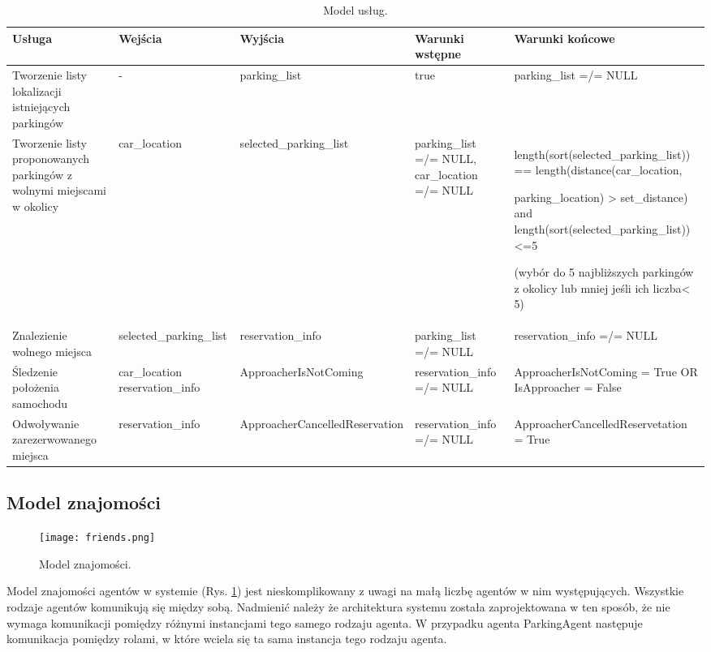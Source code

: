 \begin{table}[!h] \label{tab:modeluslug} \centering
    \caption{Model usług.}
    \begin{tabular} {| m{2cm} | m{2cm} | m{3cm} | m{3cm} | m{4cm} |} \hline
        Usługa   & Wejścia & Wyjścia & Warunki wstępne & Warunki końcowe \\ \hline
        Tworzenie listy lokalizacji istniejących parkingów & - & parking\_list & true & parking\_list =/= NULL \\ \hline
        Tworzenie listy proponowanych parkingów z wolnymi miejscami w okolicy & car\_location & selected\_\-parking\_list & parking\_list =/= NULL, car\_location =/= NULL & length(sort(selected\_\-parking\_list)) == length(distance(car\_\-location, 
        
        parking\_location) > set\_distance) and length(sort(selected\_\-parking\_list)) <=5

        (wybór  do 5 najbliższych parkingów  z okolicy lub mniej  jeśli ich liczba< 5)
         \\ \hline
        Znalezienie wolnego miejsca & selected\_\-parking\_list & reservation\_info & parking\_list =/= NULL & reservation\_info =/= NULL \\ \hline
        Śledzenie położenia samochodu & car\_location reservation\_info & ApproacherIsNot\-Coming & reservation\_info =/= NULL & ApproacherIsNot\-Coming = True OR IsApproacher = False \\ \hline
        Odwoły\-wanie zarezerwowanego miejsca & reserva\-tion\_info & Approacher\-Cancelled\-Reservation & reservation\_info =/= NULL & ApproacherCancelled\-Reservetation = True \\ \hline
    \end{tabular}
\end{table}



\newpage
\subsection{Model znajomości}

\begin{figure}[h!]
    \centering \texttt{[image: friends.png]}
    \caption{Model znajomości.}
    \label{fig:friends}
\end{figure}

Model znajomości agentów w systemie (Rys. \ref{fig:friends}) jest nieskomplikowany z uwagi na małą liczbę agentów w nim występujących. Wszystkie rodzaje agentów komunikują się między sobą. Nadmienić należy że architektura systemu została zaprojektowana w ten sposób, że nie wymaga komunikacji pomiędzy różnymi instancjami tego samego rodzaju agenta. W przypadku agenta ParkingAgent następuje komunikacja pomiędzy rolami, w które wciela się ta sama instancja tego rodzaju agenta.